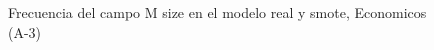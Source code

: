 \begin{figure}[H]
    \centering
    
    \caption{Frecuencia del campo M size en el modelo real y smote, Economicos (A-3)}
    \label{frecuency-M Size-smote-enc}
\end{figure}